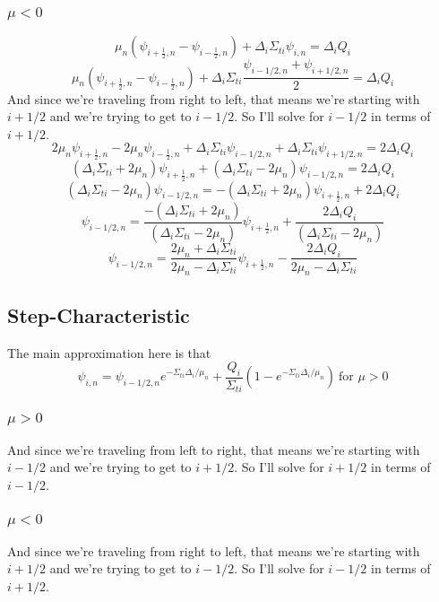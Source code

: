 \documentclass[a4paper]{article}
\begin{document}
 \subsubsection*{$\mu<0$}
\[\mu_n\left(\psi_{i+\frac{1}{2},n}-\psi_{i-\frac{1}{2},n}\right)+\Delta_i\Sigma_{ti}\psi_{i,n}=\Delta_iQ_i\]
\[\mu_n\left(\psi_{i+\frac{1}{2},n}-\psi_{i-\frac{1}{2},n}\right)+\Delta_i\Sigma_{ti}\frac{\psi_{i-1/2,n}+\psi_{i+1/2,n}}{2}=\Delta_iQ_i\]
And since we're traveling from right to left, that means we're starting with $i+1/2$ and we're trying to get to $i-1/2$. So I'll solve for $i-1/2$ in terms of $i+1/2$.
\[2\mu_n\psi_{i+\frac{1}{2},n}-2\mu_n\psi_{i-\frac{1}{2},n}+\Delta_i\Sigma_{ti}\psi_{i-1/2,n}+\Delta_i\Sigma_{ti}\psi_{i+1/2,n}=2\Delta_iQ_i\]
\[(\Delta_i\Sigma_{ti}+2\mu_n)\psi_{i+\frac{1}{2},n}+(\Delta_i\Sigma_{ti}-2\mu_n)\psi_{i-1/2,n}=2\Delta_iQ_i\]
\[(\Delta_i\Sigma_{ti}-2\mu_n)\psi_{i-1/2,n}=-(\Delta_i\Sigma_{ti}+2\mu_n)\psi_{i+\frac{1}{2},n}+2\Delta_iQ_i\]
\[\psi_{i-1/2,n}=\frac{-(\Delta_i\Sigma_{ti}+2\mu_n)}{(\Delta_i\Sigma_{ti}-2\mu_n)}\psi_{i+\frac{1}{2},n}+\frac{2\Delta_iQ_i}{(\Delta_i\Sigma_{ti}-2\mu_n)}\]
\[\boxed{\psi_{i-1/2,n}=\frac{2\mu_n+\Delta_i\Sigma_{ti}}{2\mu_n-\Delta_i\Sigma_{ti}}\psi_{i+\frac{1}{2},n}-\frac{2\Delta_iQ_i}{2\mu_n-\Delta_i\Sigma_{ti}}}\]





 \subsection*{Step-Characteristic}
 The main approximation here is that 
 \[\psi_{i,n}=\psi_{i-1/2,n}e^{-\Sigma_{ti}\Delta_i/\mu_n}+\frac{Q_i}{\Sigma_{ti}}\left(1-e^{-\Sigma_{ti}\Delta_i/\mu_n}\right)~\mbox{for }\mu>0\]

 \subsubsection*{$\mu>0$}
And since we're traveling from left to right, that means we're starting with $i-1/2$ and we're trying to get to $i+1/2$. So I'll solve for $i+1/2$ in terms of $i-1/2$.

 \subsubsection*{$\mu<0$}
And since we're traveling from right to left, that means we're starting with $i+1/2$ and we're trying to get to $i-1/2$. So I'll solve for $i-1/2$ in terms of $i+1/2$.
\end{document}
